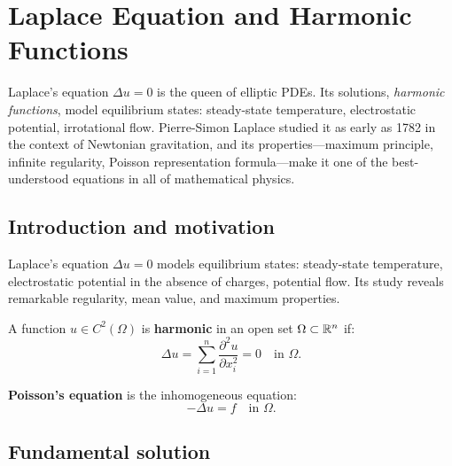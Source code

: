 \chapter{Laplace Equation and Harmonic Functions}
\label{ch:laplace}

Laplace's equation $\Delta u = 0$ is the queen of elliptic PDEs. Its solutions, \emph{harmonic functions}, model equilibrium states: steady-state temperature, electrostatic potential, irrotational flow. Pierre-Simon Laplace studied it as early as 1782 in the context of Newtonian gravitation, and its properties---maximum principle, infinite regularity, Poisson representation formula---make it one of the best-understood equations in all of mathematical physics.

\section{Introduction and motivation}

Laplace's equation $\Delta u = 0$ models equilibrium states: steady-state
temperature, electrostatic potential in the absence of charges, potential
flow. Its study reveals remarkable regularity, mean value, and maximum
properties.

\begin{definition}
A function $u \in C^2(\Omega)$ is \textbf{harmonic} in an open set
$\Omega \subset \mathbb{R}^n$ if:
\begin{equation}\label{eq:laplace}
    \Delta u = \sum_{i=1}^{n} \frac{\partial^2 u}{\partial x_i^2} = 0
    \quad \text{in } \Omega.
\end{equation}
\end{definition}

\begin{definition}
\textbf{Poisson's equation} is the inhomogeneous equation:
\begin{equation}\label{eq:poisson}
    -\Delta u = f \quad \text{in } \Omega.
\end{equation}
\end{definition}

\section{Fundamental solution}

